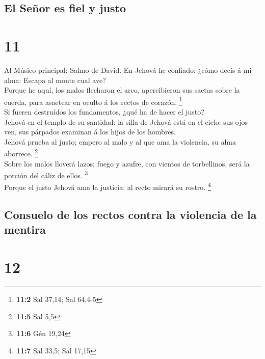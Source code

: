 \hypertarget{el-seuxf1or-es-fiel-y-justo}{%
\subsection{El Señor es fiel y
justo}\label{el-seuxf1or-es-fiel-y-justo}}

\hypertarget{section-10}{%
\section{11}\label{section-10}}

 Al Músico principal: Salmo de David. En Jehová he confiado;
¿cómo decís á mi alma: Escapa al monte cual ave?\\
 Porque he aquí, los malos flecharon el arco, apercibieron
sus saetas sobre la cuerda, para asaetear en oculto á los rectos de
corazón. \footnote{\textbf{11:2} Sal 37,14; Sal 64,4-5}\\
 Si fueren destruídos los fundamentos, ¿qué ha de hacer el
justo?\\
 Jehová en el templo de su santidad: la silla de Jehová está
en el cielo: sus ojos ven, sus párpados examinan á los hijos de los
hombres.\\
 Jehová prueba al justo; empero al malo y al que ama la
violencia, su alma aborrece. \footnote{\textbf{11:5} Sal 5,5}\\
 Sobre los malos lloverá lazos; fuego y azufre, con vientos
de torbellinos, será la porción del cáliz de ellos. \footnote{\textbf{11:6}
  Gén 19,24}\\
 Porque el justo Jehová ama la justicia: al recto mirará su
rostro. \footnote{\textbf{11:7} Sal 33,5; Sal 17,15}

\hypertarget{consuelo-de-los-rectos-contra-la-violencia-de-la-mentira}{%
\subsection{Consuelo de los rectos contra la violencia de la
mentira}\label{consuelo-de-los-rectos-contra-la-violencia-de-la-mentira}}

\hypertarget{section-11}{%
\section{12}\label{section-11}}

